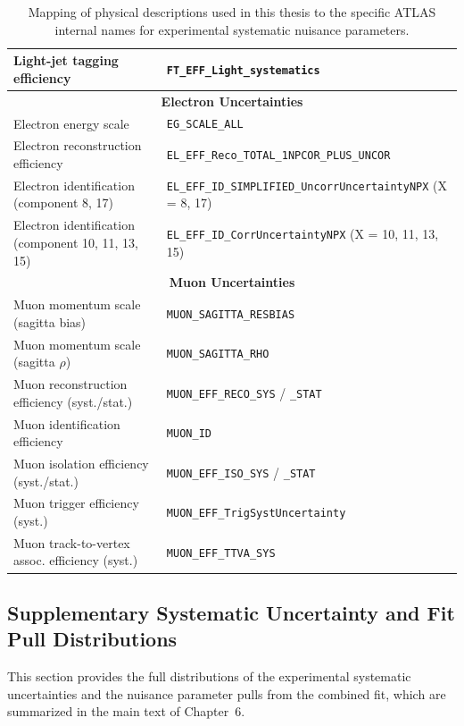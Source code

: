 \begin{table}[!htbp]
{\begin{tabular}{ll}
Light-jet tagging efficiency                    & \texttt{FT\_EFF\_Light\_systematics} \\
\midrule
\multicolumn{2}{c}{\textbf{Electron Uncertainties}} \\
\midrule
Electron energy scale                           & \texttt{EG\_SCALE\_ALL} \\
Electron reconstruction efficiency              & \texttt{EL\_EFF\_Reco\_TOTAL\_1NPCOR\_PLUS\_UNCOR} \\
Electron identification (component 8, 17)       & \texttt{EL\_EFF\_ID\_SIMPLIFIED\_UncorrUncertaintyNPX} (X = 8, 17) \\
Electron identification (component 10, 11, 13, 15) & \texttt{EL\_EFF\_ID\_CorrUncertaintyNPX} (X = 10, 11, 13, 15) \\
\midrule
\multicolumn{2}{c}{\textbf{Muon Uncertainties}} \\
\midrule
Muon momentum scale (sagitta bias)              & \texttt{MUON\_SAGITTA\_RESBIAS} \\
Muon momentum scale (sagitta $\rho$)            & \texttt{MUON\_SAGITTA\_RHO} \\
Muon reconstruction efficiency (syst./stat.)    & \texttt{MUON\_EFF\_RECO\_SYS} / \texttt{\_STAT} \\
Muon identification efficiency                  & \texttt{MUON\_ID} \\
Muon isolation efficiency (syst./stat.)         & \texttt{MUON\_EFF\_ISO\_SYS} / \texttt{\_STAT} \\
Muon trigger efficiency (syst.)                 & \texttt{MUON\_EFF\_TrigSystUncertainty} \\
Muon track-to-vertex assoc. efficiency (syst.)  & \texttt{MUON\_EFF\_TTVA\_SYS} \\
\bottomrule
\end{tabular}
}
\caption{\rm Mapping of physical descriptions used in this thesis to the specific ATLAS internal names for experimental systematic nuisance parameters.}
\label{tab:syst-mapping}
\end{table}





\subsection{Supplementary Systematic Uncertainty and Fit Pull Distributions}
\label{subsec:app_syst_plots}

This section provides the full distributions of the experimental systematic uncertainties and the nuisance parameter pulls from the combined fit, which are summarized in the main text of Chapter~6.

